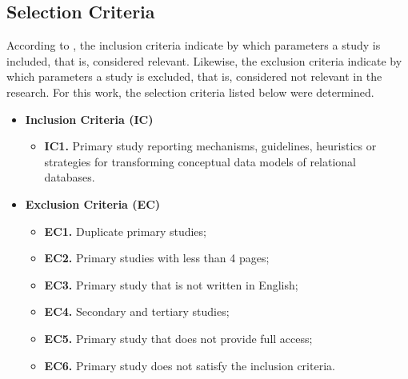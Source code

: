 \subsection{Selection Criteria} \label{ssec_slm:selectionCriteria}

According to \cite{Kitchenham:2007}, the inclusion criteria indicate by which parameters a study is included, that is, considered relevant.
Likewise, the exclusion criteria indicate by which parameters a study is excluded, that is, considered not relevant in the research.
For this work, the selection criteria listed below were determined.

\begin{itemize}
    \item \textbf{Inclusion Criteria (IC)}    
    \begin{itemize}
        \item \textbf{IC1.} Primary study reporting mechanisms, guidelines, heuristics or strategies for transforming conceptual data models of relational databases. 
    \end{itemize}
    \item \textbf{Exclusion Criteria (EC)}
    \begin{itemize}
        \item \textbf{EC1.} Duplicate primary studies;
        \item \textbf{EC2.} Primary studies with less than 4 pages;
        \item \textbf{EC3.} Primary study that is not written in English;
        \item \textbf{EC4.} Secondary and tertiary studies;
        \item \textbf{EC5.} Primary study that does not provide full access;
        \item \textbf{EC6.} Primary study does not satisfy the inclusion criteria.
    \end{itemize}
\end{itemize}

